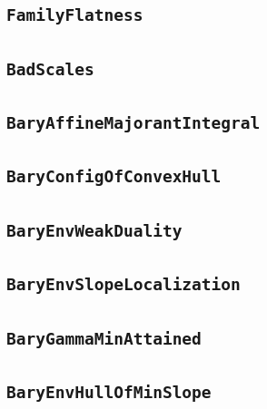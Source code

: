 \documentclass[11pt]{amsart}
\theoremstyle{definition}
\begin{document}
\subsection{\texorpdfstring{\texttt{FamilyFlatness}}{FamilyFlatness}}\label{node:FamilyFlatness}


\subsection{\texorpdfstring{\texttt{BadScales}}{BadScales}}\label{node:BadScales}


\subsection{\texorpdfstring{\texttt{BaryAffineMajorantIntegral}}{BaryAffineMajorantIntegral}}\label{node:BaryAffineMajorantIntegral}


\subsection{\texorpdfstring{\texttt{BaryConfigOfConvexHull}}{BaryConfigOfConvexHull}}\label{node:BaryConfigOfConvexHull}


\subsection{\texorpdfstring{\texttt{BaryEnvWeakDuality}}{BaryEnvWeakDuality}}\label{node:BaryEnvWeakDuality}


\subsection{\texorpdfstring{\texttt{BaryEnvSlopeLocalization}}{BaryEnvSlopeLocalization}}\label{node:BaryEnvSlopeLocalization}


\subsection{\texorpdfstring{\texttt{BaryGammaMinAttained}}{BaryGammaMinAttained}}\label{node:BaryGammaMinAttained}


\subsection{\texorpdfstring{\texttt{BaryEnvHullOfMinSlope}}{BaryEnvHullOfMinSlope}}\label{node:BaryEnvHullOfMinSlope}

\end{document}
